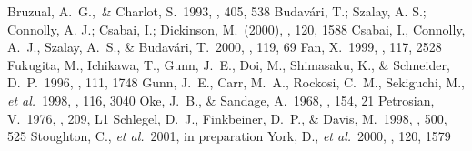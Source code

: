 Bruzual, A.~G.,~\& Charlot, S.~1993, \apj, {405}, 538
Budav\'ari, T.; Szalay, A. S.; Connolly, A. J.; Csabai, I.; Dickinson,
M.~(2000), \aj, 120, 1588
Csabai, I., Connolly, A.~J., Szalay, A.~S., \& Budav\'ari,
T.~2000, \aj, 119, 69
Fan, X.~1999, \aj, 117, 2528
Fukugita, M., Ichikawa, T., Gunn, J.~E., Doi, M., Shimasaku, K., \&
Schneider, D.~P.~1996, \aj, 111, 1748
Gunn, J.~E., Carr, M.~A., Rockosi, C.~M., Sekiguchi, M., {\it et al.}~1998, \aj, 116, 3040
Oke, J.~B., \& Sandage, A.~1968, \apj, 154, 21
Petrosian, V.~1976, \apj, 209, L1
Schlegel, D.~J., Finkbeiner, D.~P., \& Davis, M.~1998, \apj, 500, 525
Stoughton, C., {\it et al.}~2001, in preparation
York, D., {\it et al.}~2000, \aj, 120, 1579
